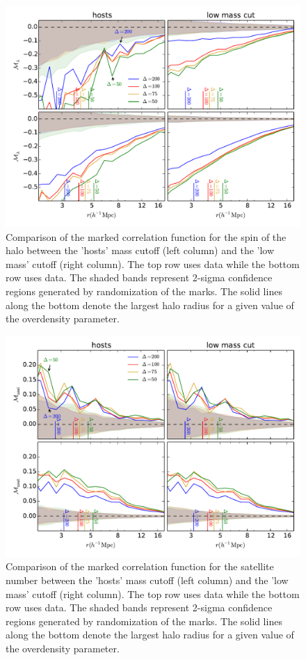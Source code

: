 \documentclass[usenatbib,usegraphicx,letterpaper]{mn2e}
\begin{document}
\begin{figure}
	\centering
	\includegraphics[width=\textwidth]{all_mcf_spin_z00_hostsvlow.pdf}
	\caption{Comparison of the marked correlation function for the spin of the halo between the 'hosts' mass cutoff (left column) and the 'low mass' cutoff (right column). The top row uses \simA data while the bottom row uses \simB data. The shaded bands represent 2-sigma confidence regions generated by randomization of the marks. The solid lines along the bottom denote the largest halo radius for a given value of the overdensity parameter.}
	\label{fig:hvl_mcf_spin}
\end{figure}

\begin{figure}
	\centering
	\includegraphics[width=\textwidth]{all_mcf_nsat_z00_hostsvlow.pdf}
	\caption{Comparison of the marked correlation function for the satellite number between the 'hosts' mass cutoff (left column) and the 'low mass' cutoff (right column). The top row uses \simA data while the bottom row uses \simB data. The shaded bands represent 2-sigma confidence regions generated by randomization of the marks. The solid lines along the bottom denote the largest halo radius for a given value of the overdensity parameter.}
	\label{fig:hvl_mcf_nsat}
\end{figure}
\end{document}
